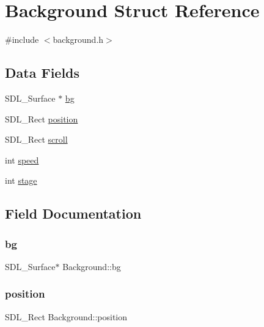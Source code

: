 \hypertarget{structBackground}{}\section{Background Struct Reference}
\label{structBackground}


{\ttfamily \#include $<$background.\+h$>$}

\subsection*{Data Fields}
\begin{DoxyCompactItemize}
\item 
S\+D\+L\+\_\+\+Surface $\ast$ \hyperlink{structBackground_ac6c54173a0dc8a7e532abb15221ed6e8}{bg}
\item 
S\+D\+L\+\_\+\+Rect \hyperlink{structBackground_a364541c5bfd25f348775693cd3106f98}{position}
\item 
S\+D\+L\+\_\+\+Rect \hyperlink{structBackground_a1b6382669cea0e079a66ae195d09efd9}{scroll}
\item 
int \hyperlink{structBackground_a9ca8ab7528306796c4a254517458fdfe}{speed}
\item 
int \hyperlink{structBackground_a24bfe0184015610a8f9aacd98509d71b}{stage}
\end{DoxyCompactItemize}


\subsection{Field Documentation}
\mbox{\label{structBackground_ac6c54173a0dc8a7e532abb15221ed6e8}} 
\subsubsection{\texorpdfstring{bg}{bg}}
{\footnotesize\ttfamily S\+D\+L\+\_\+\+Surface$\ast$ Background\+::bg}

\mbox{\label{structBackground_a364541c5bfd25f348775693cd3106f98}} 
\subsubsection{\texorpdfstring{position}{position}}
{\footnotesize\ttfamily S\+D\+L\+\_\+\+Rect Background\+::position}

